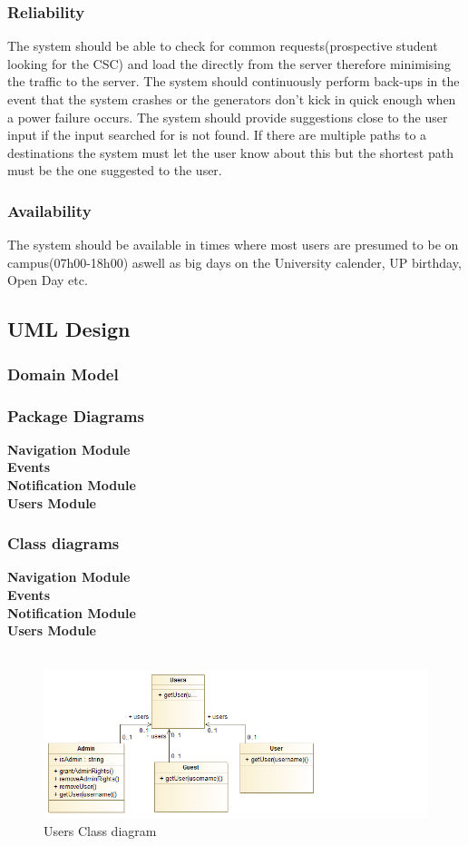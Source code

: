\documentclass[a4paper,12pt]{report}
\begin{document}
\subsubsection{Reliability}
The system should be able to check for common requests(prospective student looking for the CSC) and load the directly from the server therefore minimising the traffic to the server. The system should continuously perform back-ups in the event that the system crashes or the generators don't kick in quick enough when a power failure occurs. The system should provide suggestions close to the user input if the input searched for is not found. If there are multiple paths to a destinations the system must let the user know about this but the shortest path must be the one suggested to the user.
\subsubsection{Availability}
The system should be available in times where most users are presumed to be on campus(07h00-18h00) aswell as big days on the University calender, UP birthday, Open Day etc.

\newpage
\subsection{UML Design}
\subsubsection{Domain Model}
\subsubsection{Package Diagrams}
\textbf{Navigation Module} \\
\textbf{Events}\\
\textbf{Notification Module}\\
\textbf{Users Module}
	\subsubsection{Class diagrams}
	\textbf{Navigation Module}\\
	\textbf{Events}\\
	\textbf{Notification Module}\\
	\textbf{Users Module}\\\\
	\begin{figure}[h!]
		\includegraphics[width=\linewidth]{class.png}
		\caption{Users Class diagram}
		\label{fig:Users Class diagram}
	\end{figure}
\end{document}
